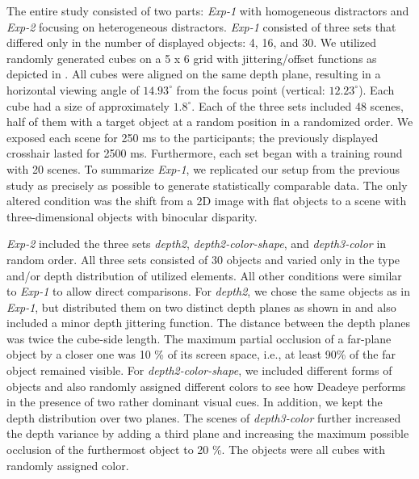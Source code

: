 \documentclass[journal]{vgtc}                %
\begin{document}
The entire study consisted of two parts: \textit{Exp-1} with homogeneous distractors and \textit{Exp-2} focusing on heterogeneous distractors. \textit{Exp-1} consisted of three sets that differed only in the number of displayed objects: 4, 16, and 30. We utilized randomly generated cubes on a 5 x 6 grid
with jittering/offset functions as depicted in . All cubes were aligned on the same depth plane, resulting in a horizontal viewing angle of $14.93^\circ$ from the focus point (vertical: $12.23^\circ$). Each cube had a size of approximately $1.8^\circ$. Each of the three sets included 48 scenes, half of them with a target object at a random position in a randomized order. We exposed each scene for 250 ms to the participants; the previously displayed crosshair lasted for 2500 ms. Furthermore, each set began with a training round with 20 scenes. To summarize \textit{Exp-1}, we replicated our setup from the previous study as precisely as possible to generate statistically comparable data. The only altered condition was the shift from a 2D image with flat objects to a scene with three-dimensional objects with binocular disparity.



\textit{Exp-2} included the three sets \textit{depth2}, \textit{depth2-color-shape}, and \textit{depth3-color} in random order. All three sets consisted of 30 objects and varied only in the type and/or depth distribution of utilized elements. All other conditions were similar to \textit{Exp-1} to allow direct comparisons. For \textit{depth2}, we chose the same objects as in \textit{Exp-1}, but distributed them on two distinct depth planes as shown in  and also included a minor depth jittering function. The distance between the depth planes was twice the cube-side length. The maximum partial occlusion of a far-plane object by a closer one was 10 \% of its screen space, i.e., at least 90\% of the far object remained visible. For \textit{depth2-color-shape}, we included different forms of objects and also randomly assigned different colors to see how Deadeye performs in the presence of two rather dominant visual cues. In addition, we kept the depth distribution over two planes. The scenes of \textit{depth3-color} further increased the depth variance by adding a third plane and increasing the maximum possible occlusion of the furthermost object to 20 \%. The objects were all cubes with randomly assigned color.
\end{document}

